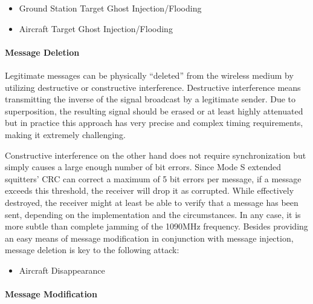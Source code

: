 \documentclass[english]{IEEEtran}
\begin{document}
\vspace{+0.1in}
\begin{itemize}
\item Ground Station Target Ghost Injection/Flooding
\item Aircraft Target Ghost Injection/Flooding\\

\end{itemize}

\paragraph*{Message Deletion}

Legitimate messages can be physically ``deleted'' from the wireless
medium by utilizing\emph{ }destructive or constructive interference.\emph{
}Destructive interference means transmitting the inverse of the signal
broadcast by a legitimate sender.\emph{ }Due to superposition, the
resulting signal should be erased or at least highly attenuated but
in practice this approach has very precise and complex timing requirements,
making it extremely challenging.\emph{ }

Constructive interference on the other hand does not require synchronization
but simply causes a large enough number of bit errors.\emph{ }Since
Mode S extended squitters' CRC can correct a maximum of 5 bit errors
per message, if a message exceeds this threshold, the receiver will
drop it as corrupted. While effectively destroyed, the receiver might
at least be able to verify that a message has been sent, depending
on the implementation and the circumstances. In any case, it is more
subtle than complete jamming of the 1090MHz frequency. Besides providing
an easy means of message modification in conjunction with message
injection, message deletion is key to the following attack:

\vspace{+0.1in}
\begin{itemize}
\item Aircraft Disappearance\\

\end{itemize}

\paragraph*{Message Modification}
\end{document}
